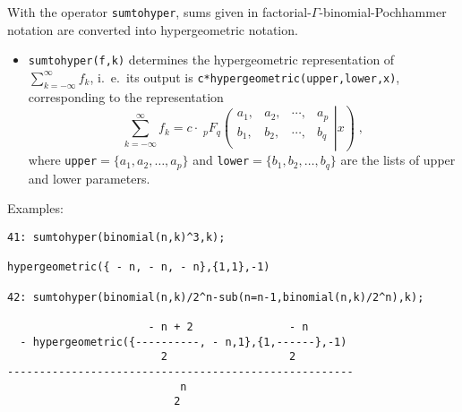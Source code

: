 With the operator {\tt sumtohyper}, sums given in 
factorial-$\Gamma$-binomial-Poch\-hammer notation
are converted into hypergeometric notation.
\begin{itemize}
\item
{\tt sumtohyper(f,k)} determines the hypergeometric representation
of\linebreak
$\sum\limits_{k=-\infty}^\infty f_k$, i.\ e.\ 
its output is {\tt c*hypergeometric(upper,lower,x)}, corresponding to
the representation
\[
\sum\limits_{k=-\infty}^\infty f_k=c\cdot\;
_{p}F_{q}\left.\left(\begin{array}{cccc}
a_{1},&a_{2},&\cdots,&a_{p}\\
b_{1},&b_{2},&\cdots,&b_{q}\\
            \end{array}\right| x\right)
\;,
\]
where {\tt upper}$=\{a_{1}, a_{2}, \ldots, a_{p}\}$
and {\tt lower}$=\{b_{1}, b_{2}, \ldots, b_{q}\}$
are the lists of upper and lower parameters.
\end{itemize}
Examples:

{\small
\begin{verbatim}
41: sumtohyper(binomial(n,k)^3,k);

hypergeometric({ - n, - n, - n},{1,1},-1)

42: sumtohyper(binomial(n,k)/2^n-sub(n=n-1,binomial(n,k)/2^n),k);

                      - n + 2               - n
  - hypergeometric({----------, - n,1},{1,------},-1)
                        2                   2
------------------------------------------------------
                           n
                          2
\end{verbatim}
}\noindent


